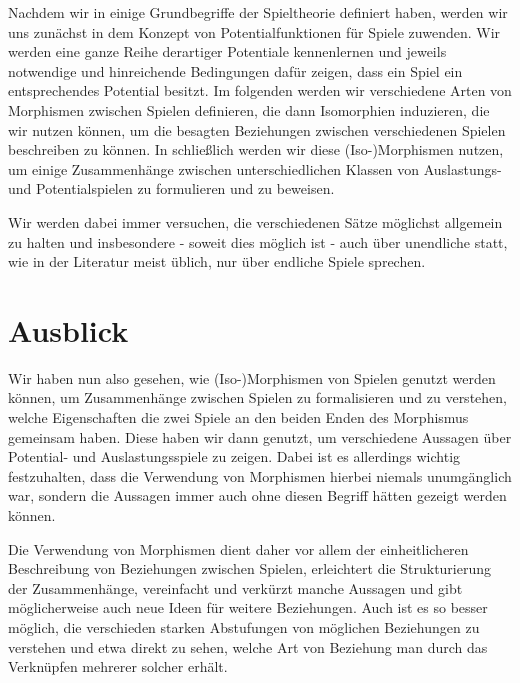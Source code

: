 \documentclass[a4paper,ngerman,11pt,bibliography=totoc]{scrartcl}
\theoremstyle{definition}
\theoremstyle{plain}
\theoremstyle{remark}
\begin{document}
Nachdem wir in  einige Grundbegriffe der Spieltheorie definiert haben, werden wir uns zunächst in  dem Konzept von Potentialfunktionen für Spiele zuwenden. Wir werden eine ganze Reihe derartiger Potentiale kennenlernen und jeweils notwendige und hinreichende Bedingungen dafür zeigen, dass ein Spiel ein entsprechendes Potential besitzt. Im folgenden  werden wir verschiedene Arten von Morphismen zwischen Spielen definieren, die dann Isomorphien induzieren, die wir nutzen können, um die besagten Beziehungen zwischen verschiedenen Spielen beschreiben zu können. In  schließlich werden wir diese (Iso-)Morphismen nutzen, um einige Zusammenhänge zwischen unterschiedlichen Klassen von Auslastungs- und Potentialspielen zu formulieren und zu beweisen.

Wir werden dabei immer versuchen, die verschiedenen Sätze möglichst allgemein zu halten und insbesondere - soweit dies möglich ist - auch über unendliche statt, wie in der Literatur meist üblich, nur über endliche Spiele sprechen.






{}
\section*{Ausblick}

Wir haben nun also gesehen, wie (Iso-)Morphismen von Spielen genutzt werden können, um Zusammenhänge zwischen Spielen zu formalisieren und zu verstehen, welche Eigenschaften die zwei Spiele an den beiden Enden des Morphismus gemeinsam haben. Diese haben wir dann genutzt, um verschiedene Aussagen über Potential- und Auslastungsspiele zu zeigen. Dabei ist es allerdings wichtig festzuhalten, dass die Verwendung von Morphismen hierbei niemals unumgänglich war, sondern die Aussagen immer auch ohne diesen Begriff hätten gezeigt werden können. 

Die Verwendung von Morphismen dient daher vor allem der einheitlicheren Beschreibung von Beziehungen zwischen Spielen, erleichtert die Strukturierung der Zusammenhänge, vereinfacht und verkürzt manche Aussagen und gibt möglicherweise auch neue Ideen für weitere Beziehungen. Auch ist es so besser möglich, die verschieden starken Abstufungen von möglichen Beziehungen zu verstehen und etwa direkt zu sehen, welche Art von Beziehung man durch das Verknüpfen mehrerer solcher erhält.
\end{document}
